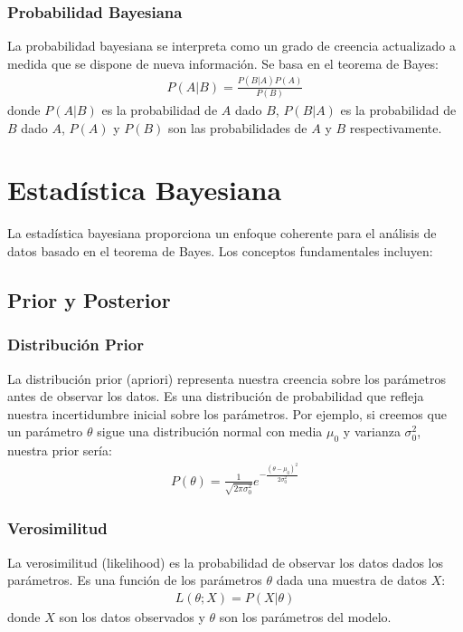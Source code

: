 \documentclass[a4paper]{report} %
\begin{document}
\subsubsection{Probabilidad Bayesiana}

La probabilidad bayesiana se interpreta como un grado de creencia actualizado a medida que se dispone de nueva informaci\'on. Se basa en el teorema de Bayes:
\begin{eqnarray*}
P(A|B) = \frac{P(B|A)P(A)}{P(B)}
\end{eqnarray*}
donde $P(A|B)$ es la probabilidad de $A$ dado $B$, $P(B|A)$ es la probabilidad de $B$ dado $A$, $P(A)$ y $P(B)$ son las probabilidades de $A$ y $B$ respectivamente.

\section{Estad\'istica Bayesiana}

La estad\'istica bayesiana proporciona un enfoque coherente para el an\'alisis de datos basado en el teorema de Bayes. Los conceptos fundamentales incluyen:

\subsection{Prior y Posterior}

\subsubsection{Distribuci\'on Prior}

La distribuci\'on prior (apriori) representa nuestra creencia sobre los par\'ametros antes de observar los datos. Es una distribuci\'on de probabilidad que refleja nuestra incertidumbre inicial sobre los par\'ametros. Por ejemplo, si creemos que un par\'ametro $\theta$ sigue una distribuci\'on normal con media $\mu_0$ y varianza $\sigma_0^2$, nuestra prior ser\'ia:
\begin{eqnarray*}
P(\theta) = \frac{1}{\sqrt{2\pi\sigma_0^2}} e^{-\frac{(\theta-\mu_0)^2}{2\sigma_0^2}}
\end{eqnarray*}

\subsubsection{Verosimilitud}

La verosimilitud (likelihood) es la probabilidad de observar los datos dados los par\'ametros. Es una funci\'on de los par\'ametros $\theta$ dada una muestra de datos $X$:
\begin{eqnarray*}
L(\theta; X) = P(X|\theta)
\end{eqnarray*}
donde $X$ son los datos observados y $\theta$ son los par\'ametros del modelo.
\end{document}
